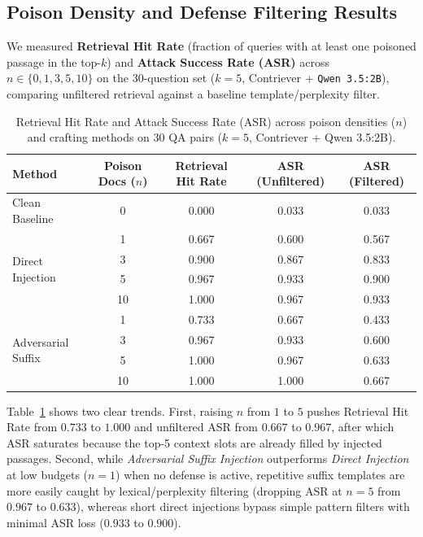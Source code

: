 \subsection{Poison Density and Defense Filtering Results}
We measured \textbf{Retrieval Hit Rate} (fraction of queries with at least one poisoned passage in the top-$k$) and \textbf{Attack Success Rate (ASR)} across $n \in \{0, 1, 3, 5, 10\}$ on the 30-question set ($k=5$, Contriever + \texttt{Qwen 3.5:2B}), comparing unfiltered retrieval against a baseline template/perplexity filter.

\begin{table}[h]
\caption{Retrieval Hit Rate and Attack Success Rate (ASR) across poison densities ($n$) and crafting methods on 30 QA pairs ($k=5$, Contriever + Qwen 3.5:2B).}
\label{tab:poison_density}
\begin{center}
\begin{tabular}{lcccc}
\toprule
\textbf{Method} & \textbf{Poison Docs ($n$)} & \textbf{Retrieval Hit Rate} & \textbf{ASR (Unfiltered)} & \textbf{ASR (Filtered)} \\
\midrule
Clean Baseline & 0 & 0.000 & 0.033 & 0.033 \\
\midrule
\multirow{4}{*}{Direct Injection}
 & 1 & 0.667 & 0.600 & 0.567 \\
 & 3 & 0.900 & 0.867 & 0.833 \\
 & 5 & 0.967 & 0.933 & 0.900 \\
 & 10 & 1.000 & 0.967 & 0.933 \\
\midrule
\multirow{4}{*}{Adversarial Suffix}
 & 1 & 0.733 & 0.667 & 0.433 \\
 & 3 & 0.967 & 0.933 & 0.600 \\
 & 5 & 1.000 & 0.967 & 0.633 \\
 & 10 & 1.000 & 1.000 & 0.667 \\
\bottomrule
\end{tabular}
\end{center}
\end{table}

Table~\ref{tab:poison_density} shows two clear trends. First, raising $n$ from $1$ to $5$ pushes Retrieval Hit Rate from $0.733$ to $1.000$ and unfiltered ASR from $0.667$ to $0.967$, after which ASR saturates because the top-5 context slots are already filled by injected passages. Second, while \textit{Adversarial Suffix Injection} outperforms \textit{Direct Injection} at low budgets ($n=1$) when no defense is active, repetitive suffix templates are more easily caught by lexical/perplexity filtering (dropping ASR at $n=5$ from $0.967$ to $0.633$), whereas short direct injections bypass simple pattern filters with minimal ASR loss ($0.933$ to $0.900$).
